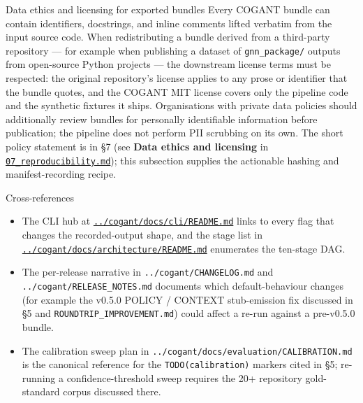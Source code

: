 \documentclass[
  ignorenonframetext,
]{beamer}
\providecommand{\tightlist}{%
  \setlength{\itemsep}{0pt}\setlength{\parskip}{0pt}}
\begin{document}
\begin{frame}[fragile]{Data ethics and licensing for exported bundles}
\protect{}\label{data-ethics-and-licensing-for-exported-bundles}
Every COGANT bundle can contain identifiers, docstrings, and inline
comments lifted verbatim from the input source code. When redistributing
a bundle derived from a third-party repository --- for example when
publishing a dataset of \texttt{gnn\_package/} outputs from open-source
Python projects --- the downstream license terms must be respected: the
original repository's license applies to any prose or identifier that
the bundle quotes, and the COGANT MIT license covers only the pipeline
code and the synthetic fixtures it ships. Organisations with private
data policies should additionally review bundles for personally
identifiable information before publication; the pipeline does not
perform PII scrubbing on its own. The short policy statement is in §7
(see \textbf{Data ethics and licensing} in
\href{07_reproducibility.md}{\texttt{07\_reproducibility.md}}); this
subsection supplies the actionable hashing and manifest-recording
recipe.
\end{frame}

\begin{frame}[fragile]{Cross-references}
\protect{}\label{cross-references}
\begin{itemize}
\tightlist
\item
  The CLI hub at
  \href{../cogant/docs/cli/README.md}{\texttt{../cogant/docs/cli/README.md}}
  links to every flag that changes the recorded-output shape, and the
  stage list in
  \href{../cogant/docs/architecture/README.md}{\texttt{../cogant/docs/architecture/README.md}}
  enumerates the ten-stage DAG.
\item
  The per-release narrative in \texttt{../cogant/CHANGELOG.md} and
  \texttt{../cogant/RELEASE\_NOTES.md} documents which default-behaviour
  changes (for example the v0.5.0 POLICY / CONTEXT stub-emission fix
  discussed in §5 and \texttt{ROUNDTRIP\_IMPROVEMENT.md}) could affect a
  re-run against a pre-v0.5.0 bundle.
\item
  The calibration sweep plan in
  \texttt{../cogant/docs/evaluation/CALIBRATION.md} is the canonical
  reference for the \texttt{TODO(calibration)} markers cited in §5;
  re-running a confidence-threshold sweep requires the 20+ repository
  gold-standard corpus discussed there.
\end{itemize}
\end{frame}
\end{document}
